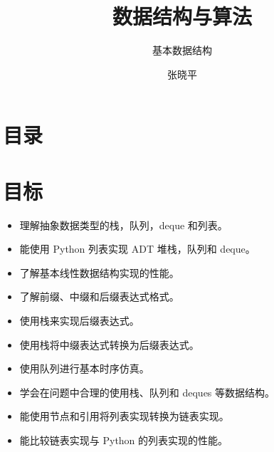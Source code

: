 \documentclass[9pt]{beamer}
\begin{document}
\title{数据结构与算法}
\subtitle{基本数据结构}
\author{张晓平}


\begin{frame}[plain]\transboxout
\titlepage
\end{frame}

\section*{目录}



\section{目标}
\begin{frame}[fragile]\ft{\secname}

\begin{itemize}
        \item 理解抽象数据类型的栈，队列，deque 和列表。
        \item 能使用 Python 列表实现 ADT 堆栈，队列和 deque。
        \item 了解基本线性数据结构实现的性能。
        \item 了解前缀、中缀和后缀表达式格式。
        \item 使用栈来实现后缀表达式。
        \item 使用栈将中缀表达式转换为后缀表达式。
        \item 使用队列进行基本时序仿真。
        \item 学会在问题中合理的使用栈、队列和 deques 等数据结构。
        \item 能使用节点和引用将列表实现转换为链表实现。
        \item 能比较链表实现与 Python 的列表实现的性能。
\end{itemize}
\end{frame}
\end{document}
